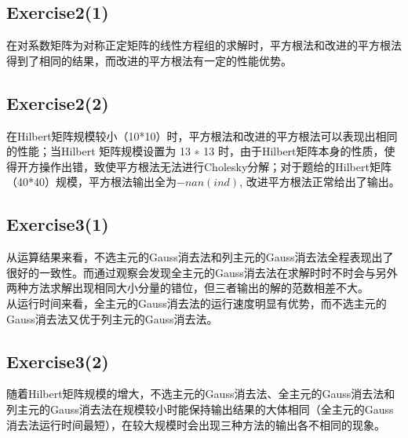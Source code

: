 \documentclass{article}
\begin{document}
\subsection*{Exercise2(1)}

在对系数矩阵为对称正定矩阵的线性方程组的求解时，平方根法和改进的平方根法得到了相同的结果，而改进的平方根法有一定的性能优势。

\subsection*{Exercise2(2)}

在Hilbert矩阵规模较小（10*10）时，平方根法和改进的平方根法可以表现出相同的性能；当Hilbert 矩阵规模设置为 13 ∗ 13 时，由于Hilbert矩阵本身的性质，使得开方操作出错，致使平方根法无法进行Cholesky分解；对于题给的Hilbert矩阵（40*40）规模，平方根法输出全为$−nan(ind)$, 改进平方根法正常给出了输出。

\subsection*{Exercise3(1)}

从运算结果来看，不选主元的Gauss消去法和列主元的Gauss消去法全程表现出了很好的一致性。而通过观察会发现全主元的Gauss消去法在求解时时不时会与另外两种方法求解出现相同大小分量的错位，但三者输出的解的范数相差不大。\\
从运行时间来看，全主元的Gauss消去法的运行速度明显有优势，而不选主元的Gauss消去法又优于列主元的Gauss消去法。

\subsection*{Exercise3(2)}

随着Hilbert矩阵规模的增大，不选主元的Gauss消去法、全主元的Gauss消去法和列主元的Gauss消去法在规模较小时能保持输出结果的大体相同（全主元的Gauss消去法运行时间最短），在较大规模时会出现三种方法的输出各不相同的现象。
\end{document}
